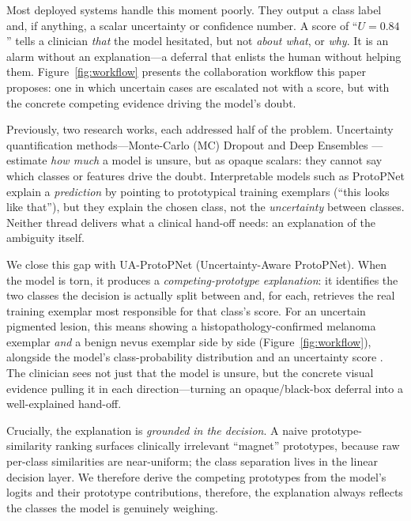 \documentclass[10pt]{article}
\newcommand{\method}{UA-ProtoPNet}
\begin{document}
Most deployed systems handle this moment poorly. They output a class label and,
if anything, a scalar uncertainty or confidence number. A score of ``$U = 0.84$''
tells a clinician \emph{that} the model hesitated, but not \emph{about what}, or
\emph{why}. It is an alarm without an explanation---a deferral that enlists the
human without helping them. Figure~\ref{fig:workflow} presents the
collaboration workflow this paper proposes: one in which uncertain cases are
escalated not with a score, but with the concrete competing evidence driving the
model's doubt.

Previously, two research works,  each addressed half of the problem. Uncertainty
quantification methods---Monte-Carlo (MC) Dropout
\parencite{gal2016dropout} and Deep Ensembles
\parencite{lakshminarayanan2017ensembles}---estimate \emph{how much} a model is
unsure, but as opaque scalars: they cannot say which classes or features drive
the doubt. Interpretable models such as ProtoPNet
\parencite{chen2019protopnet} explain a \emph{prediction} by pointing to
prototypical training exemplars (``this looks like that''), but they explain the
chosen class, not the \emph{uncertainty} between classes. Neither thread
delivers what a clinical hand-off needs: an explanation of the ambiguity itself.

We close this gap with \method{} (Uncertainty-Aware ProtoPNet). When the model
is torn, it produces a \emph{competing-prototype explanation}: it identifies the
two classes the decision is actually split between and, for each, retrieves the
real training exemplar most responsible for that class's score. For an uncertain
pigmented lesion, this means showing a histopathology-confirmed melanoma
exemplar \emph{and} a benign nevus exemplar side by side (Figure~\ref{fig:workflow}), alongside the model's
class-probability distribution and an uncertainty score
. The clinician sees not just that the model is
unsure, but the concrete visual evidence pulling it in each direction---turning
an opaque/black-box deferral into a well-explained hand-off.

Crucially, the explanation is \emph{grounded in the decision}. A naive
prototype-similarity ranking surfaces clinically irrelevant ``magnet''
prototypes, because raw per-class similarities are near-uniform; the class
separation lives in the linear decision layer. We therefore derive the competing
prototypes from the model's logits and their prototype contributions, therefore, the
explanation always reflects the classes the model is genuinely weighing.
\end{document}
